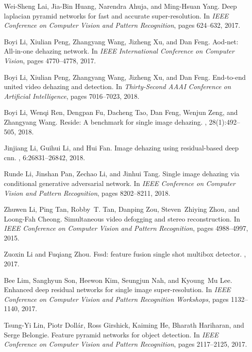 \documentclass[10pt,twocolumn,letterpaper]{article}
\begin{document}
\begin{thebibliography}{10}
Wei-Sheng Lai, Jia-Bin Huang, Narendra Ahuja, and Ming-Hsuan Yang.
\newblock Deep laplacian pyramid networks for fast and accurate
  super-resolution.
\newblock In {\em IEEE Conference on Computer Vision and Pattern Recognition},
  pages 624--632, 2017.

Boyi Li, Xiulian Peng, Zhangyang Wang, Jizheng Xu, and Dan Feng.
\newblock Aod-net: All-in-one dehazing network.
\newblock In {\em IEEE International Conference on Computer Vision}, pages
  4770--4778, 2017.

Boyi Li, Xiulian Peng, Zhangyang Wang, Jizheng Xu, and Dan Feng.
\newblock End-to-end united video dehazing and detection.
\newblock In {\em Thirty-Second AAAI Conference on Artificial Intelligence},
  pages 7016--7023, 2018.

Boyi Li, Wenqi Ren, Dengpan Fu, Dacheng Tao, Dan Feng, Wenjun Zeng, and
  Zhangyang Wang.
\newblock Reside: A benchmark for single image dehazing.
, 28(1):492--505, 2018.

Jinjiang Li, Guihui Li, and Hui Fan.
\newblock Image dehazing using residual-based deep cnn.
, 6:26831--26842, 2018.

Runde Li, Jinshan Pan, Zechao Li, and Jinhui Tang.
\newblock Single image dehazing via conditional generative adversarial network.
\newblock In {\em IEEE Conference on Computer Vision and Pattern Recognition},
  pages 8202--8211, 2018.

Zhuwen Li, Ping Tan, Robby~T. Tan, Danping Zou, Steven~Zhiying Zhou, and
  Loong-Fah Cheong.
\newblock Simultaneous video defogging and stereo reconstruction.
\newblock In {\em IEEE Conference on Computer Vision and Pattern Recognition},
  pages 4988--4997, 2015.

Zuoxin Li and Fuqiang Zhou.
\newblock Fssd: feature fusion single shot multibox detector.
, 2017.

Bee Lim, Sanghyun Son, Heewon Kim, Seungjun Nah, and Kyoung~Mu Lee.
\newblock Enhanced deep residual networks for single image super-resolution.
\newblock In {\em IEEE Conference on Computer Vision and Pattern Recognition
  Workshops}, pages 1132--1140, 2017.

Tsung-Yi Lin, Piotr Doll{\'a}r, Ross Girshick, Kaiming He, Bharath Hariharan,
  and Serge Belongie.
\newblock Feature pyramid networks for object detection.
\newblock In {\em IEEE Conference on Computer Vision and Pattern Recognition},
  pages 2117--2125, 2017.


\end{thebibliography}
\end{document}
